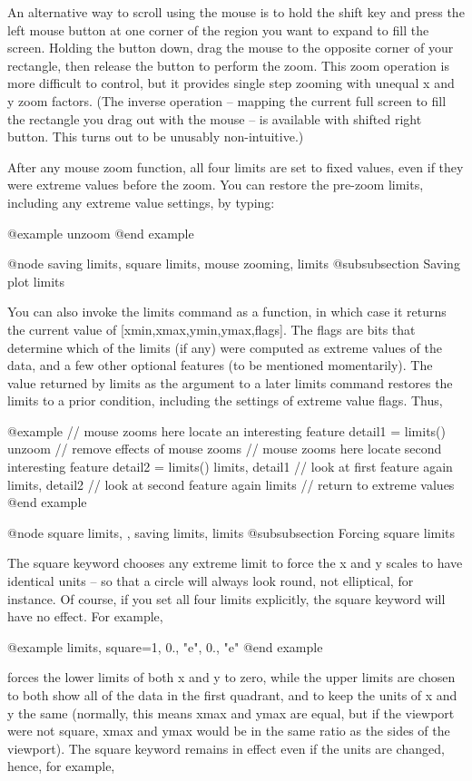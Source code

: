 An alternative way to scroll using the mouse is to hold the shift key
and press the left mouse button at one corner of the region you want
to expand to fill the screen.  Holding the button down, drag the mouse
to the opposite corner of your rectangle, then release the button to
perform the zoom.  This zoom operation is more difficult to control,
but it provides single step zooming with unequal x and y zoom factors.
(The inverse operation -- mapping the current full screen to fill the
rectangle you drag out with the mouse -- is available with shifted
right button.  This turns out to be unusably non-intuitive.)

After any mouse zoom function, all four limits are set to fixed
values, even if they were extreme values before the zoom.  You can
restore the pre-zoom limits, including any extreme value settings,
by typing:

@example
unzoom
@end example

@node saving limits, square limits, mouse zooming, limits
@subsubsection Saving plot limits

You can also invoke the limits command as a function, in which case it
returns the current value of [xmin,xmax,ymin,ymax,flags].  The flags
are bits that determine which of the limits (if any) were computed as
extreme values of the data, and a few other optional features (to be
mentioned momentarily).  The value returned by limits as the argument
to a later limits command restores the limits to a prior condition,
including the settings of extreme value flags.  Thus,

@example
         // mouse zooms here locate an interesting feature
detail1 = limits()
unzoom   // remove effects of mouse zooms
         // mouse zooms here locate second interesting feature
detail2 = limits()
limits, detail1    // look at first feature again
limits, detail2    // look at second feature again
limits   // return to extreme values
@end example

@node square limits,  , saving limits, limits
@subsubsection Forcing square limits

The square keyword chooses any extreme limit to force the x and y
scales to have identical units -- so that a circle will always look
round, not elliptical, for instance.  Of course, if you set all four
limits explicitly, the square keyword will have no effect.  For
example,

@example
limits, square=1, 0., "e", 0., "e"
@end example

forces the lower limits of both x and y to zero, while the upper
limits are chosen to both show all of the data in the first quadrant,
and to keep the units of x and y the same (normally, this means xmax
and ymax are equal, but if the viewport were not square, xmax and ymax
would be in the same ratio as the sides of the viewport).  The square
keyword remains in effect even if the units are changed, hence, for
example,

